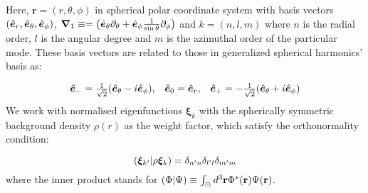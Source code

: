 Here, $\boldsymbol{r} = (r,\theta,\phi)$ in spherical polar coordinate system with basis vectors $(\hat{\bm{e}}_{r},\hat{\bm{e}}_{\theta},\hat{\bm{e}}_{\phi})$, $\bm{\nabla}_1 \equiv = \left( \hat{\bm{e}}_{\theta}\partial_{\theta} + \hat{\bm{e}}_{\phi}\frac{1}{\sin\theta}\partial_{\phi}  \right)$ and $k = (n,l,m)$ where $n$ is the radial order, $l$ is the angular degree and $m$ is the azimuthal order of the particular \snr mode.  These basis vectors are related to those in generalized spherical harmonics' basis as:
 
 \begin{equation}
     \begin{array}{ccc} \hat{\bm{e}}_{-} = \frac{1}{\sqrt{2}}(\hat{\bm{e}}_{\theta} - i \hat{\bm{e}}_{\phi}), & \hat{\bm{e}}_{0} = \hat{\bm{e}}_{r}, & \hat{\bm{e}}_{+} = -\frac{1}{\sqrt{2}}(\hat{\bm{e}}_{\theta} + i \hat{\bm{e}}_{\phi}) \\ \end{array}
 \end{equation}
We work with normalised eigenfunctions $\boldsymbol{\xi}_k$ with the spherically symmetric background density $\rho(r)$ as the weight factor, which satisfy the orthonormality condition:

\begin{equation} \label{eqn: orthonormality}
  (\bm{\xi}_{k'}|\rho\bm{\xi}_{k}) = \delta_{n'n} \delta_{l' l} \delta_{m' m}  
\end{equation}
where the inner product \inner{}{} stands for $(\Phi|\Psi) \equiv \int_{\odot} d^3\mathbf{r} \Phi^*(\mathbf{r}) \Psi(\mathbf{r})$.
